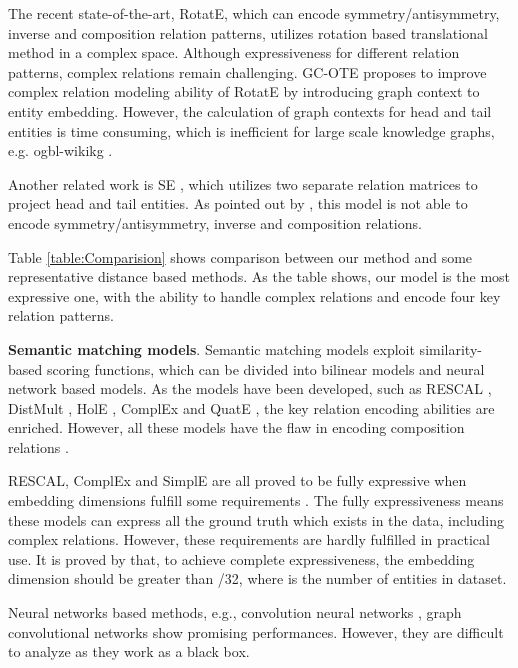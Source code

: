 \documentclass[11pt,a4paper]{article}
\begin{document}
The recent state-of-the-art, RotatE, which can encode symmetry/antisymmetry, inverse and composition relation patterns, utilizes rotation based translational method in a complex space. Although expressiveness for different relation patterns, complex relations remain challenging. 
GC-OTE \cite{tang2019orthogonal} proposes to improve complex relation modeling ability of RotatE by introducing graph context to entity embedding.  
However, the calculation of graph contexts for head and tail entities is time consuming, which is inefficient for large scale knowledge graphs, e.g. ogbl-wikikg \cite{hu2020open}.

Another related work is SE \cite{bordes2011learning}, which utilizes two separate relation matrices to project head and tail entities.
As pointed out by \cite{sun2019rotate}, this model is not able to encode symmetry/antisymmetry, inverse and composition relations.

Table \ref{table:Comparision} shows comparison between our method and some representative distance based methods.
As the table shows, our model is the most expressive one, with the ability to handle complex relations and encode four key relation patterns. 

\textbf{Semantic matching models}.
Semantic matching models exploit similarity-based scoring functions, which can be divided into bilinear models and neural network based models.
As the models have been developed, such as RESCAL \cite{nickel2011three}, DistMult \cite{yang2014embedding}, HolE \cite{nickel2016holographic}, ComplEx \cite{trouillon2016complex} and  QuatE \cite{zhang2019quaternion}, the key relation encoding abilities are enriched.  However, all these models have the flaw in encoding composition relations \cite{sun2019rotate}.

RESCAL, ComplEx and SimplE \cite{kazemi2018simple} are all proved to be fully expressive when embedding dimensions fulfill some requirements \cite{wang2018multi, trouillon2016complex, kazemi2018simple}.
The fully expressiveness means these models can express all the ground truth which exists in the data, including complex relations.
However, these requirements are hardly fulfilled in practical use.
It is proved by \cite{wang2018multi} that, to achieve complete expressiveness, the embedding dimension should be greater than /32, where  is the number of entities in dataset.

Neural networks based methods, e.g., convolution neural networks \cite{dettmers2018convolutional}, graph convolutional networks \cite{schlichtkrull2018modeling}  show promising performances.
However, they are difficult to analyze as they work as a black box.
\end{document}
